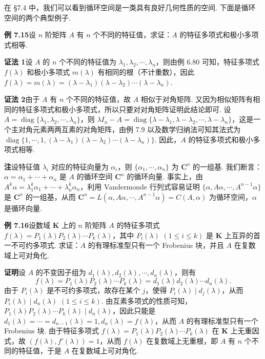 \documentclass[UTF8, 12pt, fontset=fandol, oneside]{ctexart}
\begin{document}
在 §7.4 中，我们可以看到循环空间是一类具有良好几何性质的空间. 下面是循环空间的两个典型例子.

\noindent\textbf{例 7.15}\quad 设 $n$ 阶矩阵 $A$ 有 $n$ 个不同的特征值，求证：$A$ 的特征多项式和极小多项式相等.

\noindent\textbf{证法 1}\quad 设 $A$ 的 $n$ 个不同的特征值为 $\lambda_1,\lambda_2,\cdots,\lambda_n$，则由例 6.80 可知，特征多项式 $f(\lambda)$ 和极小多项式 $m(\lambda)$ 有相同的根（不计重数），因此 $f(\lambda)=m(\lambda)=(\lambda-\lambda_1)(\lambda-\lambda_2)\cdots(\lambda-\lambda_n)$.

\noindent\textbf{证法 2}\quad 由于 $A$ 有 $n$ 个不同的特征值，故 $A$ 相似于对角矩阵. 又因为相似矩阵有相同的特征多项式和极小多项式，所以只要对对角矩阵证明此结论即可. 设 $A=\operatorname{diag}\{\lambda_1,\lambda_2,\cdots,\lambda_n\}$，则 $\lambda I_n-A=\operatorname{diag}\{\lambda-\lambda_1,\lambda-\lambda_2,\cdots,\lambda-\lambda_n\}$，这是一个主对角元素两两互素的对角矩阵，由例 7.9 以及数学归纳法可知其法式为 $\operatorname{diag}\{1,\cdots,1,(\lambda-\lambda_1)(\lambda-\lambda_2)\cdots(\lambda-\lambda_n)\}$. 因此，$A$ 的特征多项式和极小多项式相等.

\noindent\textbf{注}\quad 设特征值 $\lambda_i$ 对应的特征向量为 $\alpha_i$，则 $\{\alpha_1,\cdots,\alpha_n\}$ 为 $\mathbf{C}^n$ 的一组基. 我们断言：$\alpha=\alpha_1+\cdots+\alpha_n$ 是 $A$ 的循环空间 $\mathbf{C}^n$ 的循环向量. 事实上，由 $A^k\alpha=\lambda_1^k\alpha_1+\cdots+\lambda_n^k\alpha_n$，利用 Vandermonde 行列式容易证明 $\{\alpha,A\alpha,\cdots,A^{n-1}\alpha\}$ 是 $\mathbf{C}^n$ 的一组基，从而 $\mathbf{C}^n=L(\alpha,A\alpha,\cdots,A^{n-1}\alpha)=C(A,\alpha)$ 为循环空间，$\alpha$ 是循环向量.

\noindent\textbf{例 7.16}\quad 设数域 $\mathbf{K}$ 上的 $n$ 阶矩阵 $A$ 的特征多项式 $f(\lambda)=P_1(\lambda)P_2(\lambda)\cdots P_k(\lambda)$，其中 $P_i(\lambda)$ $(1\le i\le k)$ 是 $\mathbf{K}$ 上互异的首一不可约多项式. 求证：$A$ 的有理标准型只有一个 Frobenius 块，并且 $A$ 在复数域上可对角化.

\noindent\textbf{证明}\quad 设 $A$ 的不变因子组为 $d_1(\lambda),d_2(\lambda),\cdots,d_n(\lambda)$，则有
\[
f(\lambda)=P_1(\lambda)P_2(\lambda)\cdots P_k(\lambda)=d_1(\lambda)d_2(\lambda)\cdots d_n(\lambda).
\]
由于 $P_i(\lambda)$ 是不可约多项式，故存在某个 $j$，使得 $P_i(\lambda)\mid d_j(\lambda)$，从而 $P_i(\lambda)\mid d_n(\lambda)$ $(1\le i\le k)$. 由互素多项式的性质可知，$P_1(\lambda)P_2(\lambda)\cdots P_k(\lambda)\mid d_n(\lambda)$，因此只能是 $d_1(\lambda)=\cdots=d_{n-1}(\lambda)=1,d_n(\lambda)=f(\lambda)$，从而 $A$ 的有理标准型只有一个 Frobenius 块. 由于特征多项式 $f(\lambda)=P_1(\lambda)P_2(\lambda)\cdots P_k(\lambda)$ 在 $\mathbf{K}$ 上无重因式，故 $(f(\lambda),f'(\lambda))=1$，从而 $f(\lambda)$ 在复数域上无重根，即 $A$ 有 $n$ 个不同的特征值，于是 $A$ 在复数域上可对角化.
\end{document}
